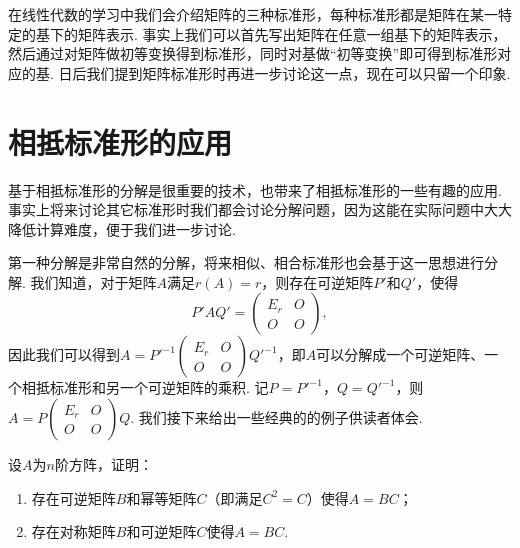 在线性代数的学习中我们会介绍矩阵的三种标准形，每种标准形都是矩阵在某一特定的基下的矩阵表示. 事实上我们可以首先写出矩阵在任意一组基下的矩阵表示，然后通过对矩阵做初等变换得到标准形，同时对基做``初等变换''即可得到标准形对应的基. 日后我们提到矩阵标准形时再进一步讨论这一点，现在可以只留一个印象.

\section{相抵标准形的应用}

基于相抵标准形的分解是很重要的技术，也带来了相抵标准形的一些有趣的应用. 事实上将来讨论其它标准形时我们都会讨论分解问题，因为这能在实际问题中大大降低计算难度，便于我们进一步讨论.

第一种分解是非常自然的分解，将来相似、相合标准形也会基于这一思想进行分解. 我们知道，对于矩阵$A$满足$r(A)=r$，则存在可逆矩阵$P'$和$Q'$，使得
\[P'AQ'=\begin{pmatrix}
        E_r & O \\ O & O
    \end{pmatrix},\]
因此我们可以得到$A=P'^{-1}\begin{pmatrix}
        E_r & O \\ O & O
    \end{pmatrix}Q'^{-1}$，即$A$可以分解成一个可逆矩阵、一个相抵标准形和另一个可逆矩阵的乘积. 记$P=P'^{-1}$，$Q=Q'^{-1}$，则$A=P\begin{pmatrix}
        E_r & O \\ O & O
    \end{pmatrix}Q$. 我们接下来给出一些经典的的例子供读者体会.

\begin{example}{}{}
    设$A$为$n$阶方阵，证明：
    \begin{enumerate}
        \item 存在可逆矩阵$B$和幂等矩阵$C$（即满足$C^2=C$）使得$A=BC$；
        \item 存在对称矩阵$B$和可逆矩阵$C$使得$A=BC$.
    \end{enumerate}
\end{example}

